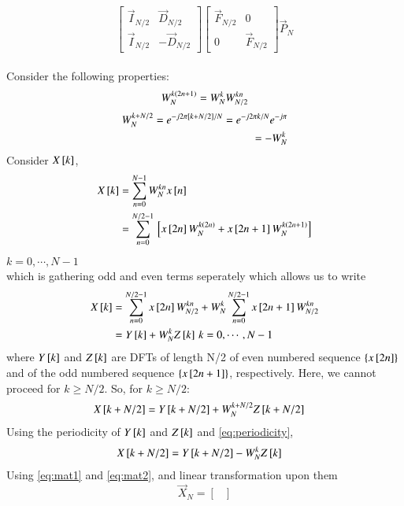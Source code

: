 \documentclass[journal,12pt,twocolumn]{IEEEtran}
\renewcommand\thesection{\arabic{section}}
\begin{document}
\begin{enumerate}[label=\arabic*.,ref=\thesection.\theenumi]
\begin{equation}
\begin{bmatrix}
			\vec{I}_{N/2} & \vec{D}_{N/2} \\
			\vec{I}_{N/2} & -\vec{D}_{N/2}
		\end{bmatrix}
		\begin{bmatrix}
			\vec{F}_{N/2} & 0 \\
			0 & \vec{F}_{N/2}
		\end{bmatrix}
		\vec{P}_{N}
	\end{equation}
	\solution \\
	Consider the following properties:
	\begin{align}
		W_N^{k\left(2n+1\right)}=W_N^{k}W_{N/2}^{kn}
	\end{align}
	\begin{align}
		\label{eq:periodicity}
		W_N^{k+N/2}=e^{- j 2 \pi {}\left[k+N/2\right] / N }=e^{- j 2 \pi k / N }e^{- j \pi}\\
		=-W_N^{k}
	\end{align}
	Consider $X{}\left[k\right]$,
	\begin{align}
		X{}\left[k\right]&=\sum_{n=0}^{N-1}W_N^{kn} x{}\left[n\right] \\
		&=\sum_{n=0}^{N/2-1}{}\left[x{}\left[2n\right]W_N^{k\left(2n\right)}+x{}\left[2n+1\right]W_N^{k\left(2n+1\right)}\right]
	\end{align}
	$k=0,\cdots,N-1$\\
	which is gathering odd and even terms seperately
	which allows us to write
	\begin{align}
		X{}\left[k\right]&=\sum_{n=0}^{N/2-1}x{}\left[2n\right]W_{N/2}^{kn}+W_N^k\sum_{n=0}^{N/2-1}x{}\left[2n+1\right]W_{N/2}^{kn}\\
		\label{eq:mat1}
		&=Y{}\left[k\right]+W_N^k Z{}\left[k\right] \,k=0,\cdots,N-1
	\end{align}
	where $Y{}\left[k\right]$ and $Z{}\left[k\right]$ are DFTs of length N/2 of even numbered sequence $\left\{x{}\left[2n\right]\right\}$ and of the odd numbered sequence $\left\{x{}\left[2n+1\right]\right\}$, respectively. Here, we cannot proceed for $k\ge N/2$. So, for $k \ge N/2:$
	\begin{align}
		X{}\left[k+N/2\right]&=Y{}\left[k+N/2\right]+W_N^{k+N/2} Z{}\left[k+N/2\right]
	\end{align}
	Using the periodicity of $Y{}\left[k\right]$ and $Z{}\left[k\right]$ and \eqref{eq:periodicity},
	\begin{align}
		\label{eq:mat2}
		X{}\left[k+N/2\right]&=Y{}\left[k+N/2\right]-W_N^{k} Z{}\left[k\right]
	\end{align}
	Using \eqref{eq:mat1} and \eqref{eq:mat2}, and linear transformation upon them
	\begin{equation}
		\label{eq:fmat}
		\vec{X}_{N}=
		\begin{bmatrix}

\end{bmatrix}
\end{equation}
\end{enumerate}
\end{document}
